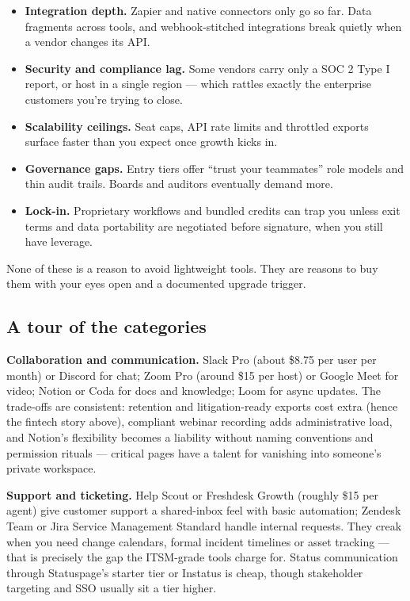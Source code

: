 \begin{itemize}[leftmargin=*]
\item \textbf{Integration depth.} Zapier and native connectors only go so far. Data fragments across tools, and webhook-stitched integrations break quietly when a vendor changes its API.
\item \textbf{Security and compliance lag.} Some vendors carry only a SOC 2 Type I report, or host in a single region — which rattles exactly the enterprise customers you're trying to close.
\item \textbf{Scalability ceilings.} Seat caps, API rate limits and throttled exports surface faster than you expect once growth kicks in.
\item \textbf{Governance gaps.} Entry tiers offer ``trust your teammates'' role models and thin audit trails. Boards and auditors eventually demand more.
\item \textbf{Lock-in.} Proprietary workflows and bundled credits can trap you unless exit terms and data portability are negotiated before signature, when you still have leverage.
\end{itemize}

None of these is a reason to avoid lightweight tools. They are reasons to buy them with your eyes open and a documented upgrade trigger.



\subsection{A tour of the categories}


\textbf{Collaboration and communication.} Slack Pro (about \$8.75 per user per month) or Discord for chat; Zoom Pro (around \$15 per host) or Google Meet for video; Notion or Coda for docs and knowledge; Loom for async updates. The trade-offs are consistent: retention and litigation-ready exports cost extra (hence the fintech story above), compliant webinar recording adds administrative load, and Notion's flexibility becomes a liability without naming conventions and permission rituals — critical pages have a talent for vanishing into someone's private workspace.


\textbf{Support and ticketing.} Help Scout or Freshdesk Growth (roughly \$15 per agent) give customer support a shared-inbox feel with basic automation; Zendesk Team or Jira Service Management Standard handle internal requests. They creak when you need change calendars, formal incident timelines or asset tracking — that is precisely the gap the ITSM-grade tools charge for. Status communication through Statuspage's starter tier or Instatus is cheap, though stakeholder targeting and SSO usually sit a tier higher.


